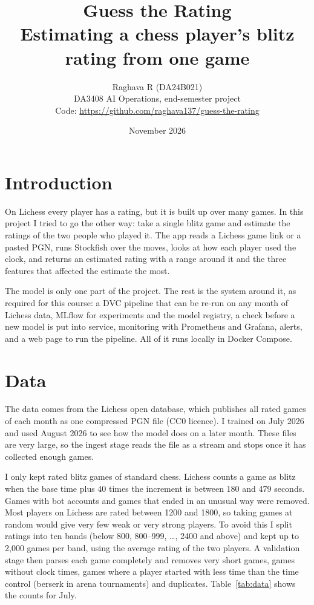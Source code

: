 \documentclass[11pt,a4paper]{article}
\title{\textbf{Guess the Rating}\\[4pt]
\large Estimating a chess player's blitz rating from one game}
\author{Raghava R (DA24B021)\\
DA3408 AI Operations, end-semester project\\
\small Code: \url{https://github.com/raghava137/guess-the-rating}}
\date{November 2026}
\begin{document}
\maketitle

\section{Introduction}

On Lichess every player has a rating, but it is built up over many games. In this project I
tried to go the other way: take a single blitz game and estimate the ratings of the two people
who played it. The app reads a Lichess game link or a pasted PGN, runs Stockfish over the moves,
looks at how each player used the clock, and returns an estimated rating with a range around it
and the three features that affected the estimate the most.

The model is only one part of the project. The rest is the system around it, as required for
this course: a DVC pipeline that can be re-run on any month of Lichess data, MLflow for
experiments and the model registry, a check before a new model is put into service, monitoring
with Prometheus and Grafana, alerts, and a web page to run the pipeline. All of it runs locally
in Docker Compose.

\section{Data}

The data comes from the Lichess open database, which publishes all rated games of each month as
one compressed PGN file (CC0 licence). I trained on July 2026 and used August 2026 to see how the
model does on a later month. These files are very large, so the ingest stage reads the file as
a stream and stops once it has collected enough games.

I only kept rated blitz games of standard chess. Lichess counts a game as blitz when the base time
plus 40 times the increment is between 180 and 479 seconds. Games with bot accounts and games that
ended in an unusual way were removed. Most players on Lichess are rated between 1200 and 1800, so
taking games at random would give very few weak or very strong players. To avoid this I split
ratings into ten bands (below 800, 800--999, \dots, 2400 and above) and kept up to 2,000 games per
band, using the average rating of the two players. A validation stage then parses each game
completely and removes very short games, games without clock times, games where a player
started with less time than the time control (berserk in arena tournaments) and duplicates.
Table~\ref{tab:data} shows the counts for July.
\end{document}

